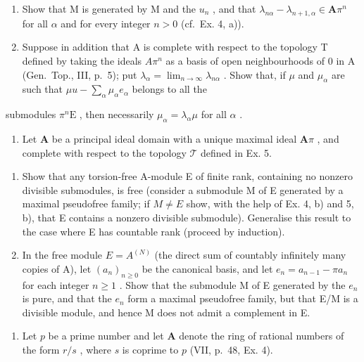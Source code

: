 \begin{enumerate}
\def\labelenumi{\alph{enumi})}
\item
  Show that M is generated by M and the \(u_{n}\) , and that \(\lambda_{n\alpha} - \lambda_{n + 1,\alpha} \in \mathbf{A}\pi^n\) for all \(\alpha\) and for every integer \(n > 0\) (cf.~Ex. 4, a)).
\item
  Suppose in addition that A is complete with respect to the topology T defined by taking the ideals \(A\pi^{n}\) as a basis of open neighbourhoods of 0 in A (Gen.~Top., III, p.~5); put \(\lambda_{\alpha} = \lim_{n \to \infty} \lambda_{n\alpha}\) . Show that, if \(\mu\) and \(\mu_{\alpha}\) are such that \(\mu u - \sum_{\alpha} \mu_{\alpha} e_{\alpha}\) belongs to all the
\end{enumerate}

submodules \(\pi^n\mathrm{E}\) , then necessarily \(\mu_{\alpha} = \lambda_{\alpha}\mu\) for all \(\alpha\) .

\begin{enumerate}
\def\labelenumi{\arabic{enumi})}
\setcounter{enumi}{5}
\tightlist
\item
  Let \(\mathbf{A}\) be a principal ideal domain with a unique maximal ideal \(\mathbf{A}\pi\) , and complete with respect to the topology \(\mathcal{T}\) defined in Ex. 5.
\end{enumerate}

\begin{enumerate}
\def\labelenumi{\alph{enumi})}
\item
  Show that any torsion-free A-module E of finite rank, containing no nonzero divisible submodules, is free (consider a submodule M of E generated by a maximal pseudofree family; if \(M \neq E\) show, with the help of Ex. 4, b) and 5, b), that E contains a nonzero divisible submodule). Generalise this result to the case where E has countable rank (proceed by induction).
\item
  In the free module \(E = A^{(N)}\) (the direct sum of countably infinitely many copies of A), let \((a_{n})_{n \geq 0}\) be the canonical basis, and let \(e_{n} = a_{n-1} - \pi a_{n}\) for each integer \(n \geq 1\) . Show that the submodule M of E generated by the \(e_{n}\) is pure, and that the \(e_{n}\) form a maximal pseudofree family, but that E/M is a divisible module, and hence M does not admit a complement in E.
\end{enumerate}

\begin{enumerate}
\def\labelenumi{\arabic{enumi})}
\setcounter{enumi}{6}
\tightlist
\item
  Let \(p\) be a prime number and let \(\mathbf{A}\) denote the ring of rational numbers of the form \(r / s\) , where \(s\) is coprime to \(p\) (VII, p.~48, Ex. 4).
\end{enumerate}

